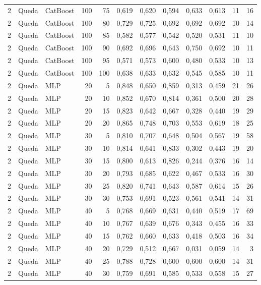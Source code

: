 \begin{longtable}{@{}rllrrrrrrrrr@{}}
2 & Queda & CatBoost & 100 & 75 & 0,619 & 0,620 & 0,594 & 0,633 & 0,613 & 11 & 16 \\
2 & Queda & CatBoost & 100 & 80 & 0,729 & 0,725 & 0,692 & 0,692 & 0,692 & 10 & 14 \\
2 & Queda & CatBoost & 100 & 85 & 0,582 & 0,577 & 0,542 & 0,520 & 0,531 & 11 & 10 \\
2 & Queda & CatBoost & 100 & 90 & 0,692 & 0,696 & 0,643 & 0,750 & 0,692 & 10 & 11 \\
2 & Queda & CatBoost & 100 & 95 & 0,571 & 0,573 & 0,600 & 0,480 & 0,533 & 10 & 13 \\
2 & Queda & CatBoost & 100 & 100 & 0,638 & 0,633 & 0,632 & 0,545 & 0,585 & 10 & 11 \\
2 & Queda & MLP & 20 & 5 & 0,848 & 0,650 & 0,859 & 0,313 & 0,459 & 21 & 26 \\
2 & Queda & MLP & 20 & 10 & 0,852 & 0,670 & 0,814 & 0,361 & 0,500 & 20 & 28 \\
2 & Queda & MLP & 20 & 15 & 0,823 & 0,642 & 0,667 & 0,328 & 0,440 & 19 & 29 \\
2 & Queda & MLP & 20 & 20 & 0,865 & 0,748 & 0,703 & 0,553 & 0,619 & 18 & 25 \\
2 & Queda & MLP & 30 & 5 & 0,810 & 0,707 & 0,648 & 0,504 & 0,567 & 19 & 58 \\
2 & Queda & MLP & 30 & 10 & 0,814 & 0,641 & 0,833 & 0,302 & 0,443 & 19 & 20 \\
2 & Queda & MLP & 30 & 15 & 0,800 & 0,613 & 0,826 & 0,244 & 0,376 & 16 & 14 \\
2 & Queda & MLP & 30 & 20 & 0,793 & 0,685 & 0,622 & 0,467 & 0,533 & 16 & 30 \\
2 & Queda & MLP & 30 & 25 & 0,820 & 0,741 & 0,643 & 0,587 & 0,614 & 15 & 26 \\
2 & Queda & MLP & 30 & 30 & 0,753 & 0,691 & 0,523 & 0,561 & 0,541 & 14 & 31 \\
2 & Queda & MLP & 40 & 5 & 0,768 & 0,669 & 0,631 & 0,440 & 0,519 & 17 & 69 \\
2 & Queda & MLP & 40 & 10 & 0,767 & 0,639 & 0,676 & 0,343 & 0,455 & 16 & 33 \\
2 & Queda & MLP & 40 & 15 & 0,762 & 0,660 & 0,633 & 0,418 & 0,503 & 16 & 34 \\
2 & Queda & MLP & 40 & 20 & 0,729 & 0,512 & 0,667 & 0,031 & 0,059 & 14 & 3 \\
2 & Queda & MLP & 40 & 25 & 0,788 & 0,728 & 0,600 & 0,600 & 0,600 & 14 & 31 \\
2 & Queda & MLP & 40 & 30 & 0,759 & 0,691 & 0,585 & 0,533 & 0,558 & 15 & 27 \\

\end{longtable}
